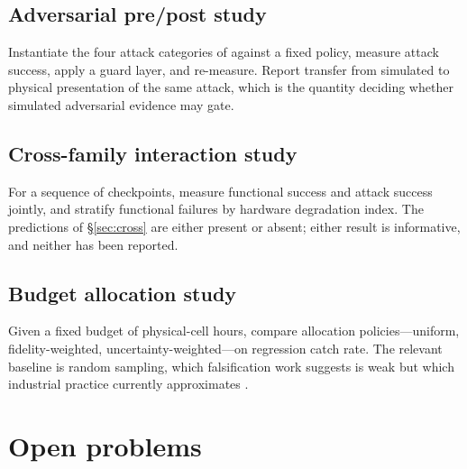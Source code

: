 \documentclass[11pt]{article}
\theoremstyle{definition}
\begin{document}
\subsection{Adversarial pre/post study}
Instantiate the four attack categories of \citep{paperhijack} against a fixed policy, measure
attack success, apply a guard layer, and re-measure. Report transfer from simulated to
physical presentation of the same attack, which is the quantity deciding whether simulated
adversarial evidence may gate.

\subsection{Cross-family interaction study}
For a sequence of checkpoints, measure functional success and attack success jointly, and
stratify functional failures by hardware degradation index. The predictions of
\S\ref{sec:cross} are either present or absent; either result is informative, and neither has
been reported.

\subsection{Budget allocation study}
\label{sec:budget}
Given a fixed budget of physical-cell hours, compare allocation policies---uniform,
fidelity-weighted, uncertainty-weighted---on regression catch rate. The relevant baseline is
random sampling, which falsification work suggests is weak but which industrial practice
currently approximates \citep{robogate,formalsurvey}.

\section{Open problems}
\label{sec:open}
\end{document}
